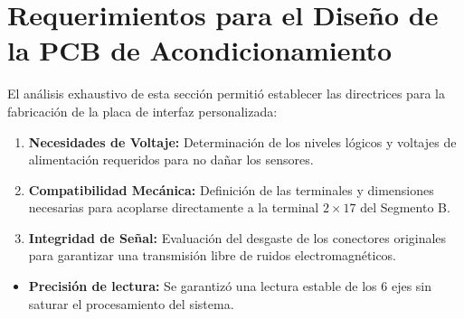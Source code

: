 \section{Requerimientos para el Diseño de la PCB de Acondicionamiento}
El análisis exhaustivo de esta sección permitió establecer las directrices para la fabricación de la placa de interfaz personalizada:
\begin{enumerate}
	\item \textbf{Necesidades de Voltaje:} Determinación de los niveles lógicos y voltajes de alimentación requeridos para no dañar los sensores.
	\item \textbf{Compatibilidad Mecánica:} Definición de las terminales y dimensiones necesarias para acoplarse directamente a la terminal $2 \times 17$ del Segmento B.
	\item \textbf{Integridad de Señal:} Evaluación del desgaste de los conectores originales para garantizar una transmisión libre de ruidos electromagnéticos.
\end{enumerate}

\clearpage
\begin{resultadosFase}
	\begin{itemize}
		\item \textbf{Precisión de lectura:} Se garantizó una lectura estable de los 6 ejes sin saturar el procesamiento del sistema.
	\end{itemize}
\end{resultadosFase}
